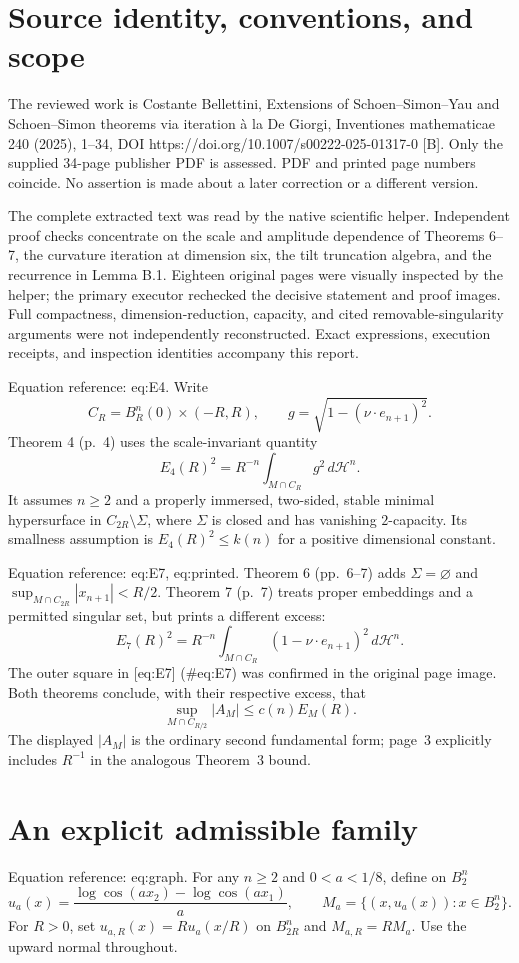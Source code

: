 \documentclass[10pt]{article}
\begin{document}
\section*{Source identity, conventions, and scope}
The reviewed work is Costante Bellettini, Extensions of Schoen–Simon–Yau and Schoen–Simon theorems via iteration à la De Giorgi, Inventiones mathematicae 240 (2025), 1–34, DOI https://doi.org/10.1007/s00222-025-01317-0 [B]. Only the supplied 34-page publisher PDF is assessed. PDF and printed page numbers coincide. No assertion is made about a later correction or a different version.\par
The complete extracted text was read by the native scientific helper. Independent proof checks concentrate on the scale and amplitude dependence of Theorems 6–7, the curvature iteration at dimension six, the tilt truncation algebra, and the recurrence in Lemma B.1. Eighteen original pages were visually inspected by the helper; the primary executor rechecked the decisive statement and proof images. Full compactness, dimension-reduction, capacity, and cited removable-singularity arguments were not independently reconstructed. Exact expressions, execution receipts, and inspection identities accompany this report.\par
Equation reference: eq:E4. Write \[C_R=B_R^n(0)\times(-R,R),\qquad
 g=\sqrt{1-(\nu\cdot e_{n+1})^2}.\] Theorem 4 (p. 4) uses the scale-invariant quantity \[
 E_4(R)^2=R^{-n}\int_{M\cap C_R}g^2\,d\mathcal H^n.\] It assumes \(n\ge2\) and a properly immersed, two-sided, stable minimal hypersurface in \(C_{2R}\setminus\Sigma\), where \(\Sigma\) is closed and has vanishing \(2\)-capacity. Its smallness assumption is \(E_4(R)^2\le k(n)\) for a positive dimensional constant.\par
Equation reference: eq:E7, eq:printed. Theorem 6 (pp. 6–7) adds \(\Sigma=\varnothing\) and \(\sup_{M\cap C_{2R}}|x_{n+1}|<R/2\). Theorem 7 (p. 7) treats proper embeddings and a permitted singular set, but prints a different excess: \[
 E_7(R)^2=R^{-n}\int_{M\cap C_R}(1-\nu\cdot e_{n+1})^2\,d\mathcal H^n .\] The outer square in [eq:E7] (\#eq:E7) was confirmed in the original page image. Both theorems conclude, with their respective excess, that \[
 \sup_{M\cap C_{R/2}}|A_M|\le c(n)E_M(R).\] The displayed \(|A_M|\) is the ordinary second fundamental form; page 3 explicitly includes \(R^{-1}\) in the analogous Theorem 3 bound.\par
\section*{An explicit admissible family}
Equation reference: eq:graph. For any \(n\ge2\) and \(0<a<1/8\), define on \(B_2^n\) \[
 u_a(x)=\frac{\log\cos(ax_2)-\log\cos(ax_1)}{a},
 \qquad M_a=\{(x,u_a(x)):x\in B_2^n\}.\] For \(R>0\), set \(u_{a,R}(x)=Ru_a(x/R)\) on \(B_{2R}^n\) and \(M_{a,R}=RM_a\). Use the upward normal throughout.\par
\end{document}
